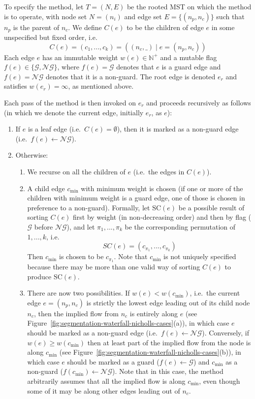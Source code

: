 \documentclass[preprint,a4paper]{elsarticle}
\begin{document}
To specify the method, let $T = (N,E)$ be the rooted MST on which the method is to operate, with node set $N = (n_i)$ and edge set $E = \{(n_p,n_c)\}$ such that $n_p$ is the parent of $n_c$. We define $C(e)$ to be the children of edge $e$ in some unspecified but fixed order, i.e.
%
\[
C(e) = (c_1,...,c_k) = ((n_c,\_) \; | \; e = (n_p,n_c))
\]
%
Each edge $e$ has an immutable weight $w(e) \in \mathbb{N}^+$ and a mutable flag $f(e) \in \{\mathcal{G},\mathcal{NG}\}$, where $f(e) = \mathcal{G}$ denotes that $e$ is a guard edge and $f(e) = \mathcal{NG}$ denotes that it is a non-guard. The root edge is denoted $e_r$ and satisfies $w(e_r) = \infty$, as mentioned above.

Each pass of the method is then invoked on $e_r$ and proceeds recursively as follows (in which we denote the current edge, initially $e_r$, as $e$):
%
\begin{enumerate}

\item If $e$ is a leaf edge (i.e.~$C(e) = \emptyset$), then it is marked as a non-guard edge (i.e.~$f(e) \leftarrow \mathcal{NG}$).

\item Otherwise:

\begin{enumerate}

\item We recurse on all the children of $e$ (i.e.~the edges in $C(e)$).

\item A child edge $c_{\min}$ with minimum weight is chosen (if one or more of the children with minimum weight is a guard edge, one of those is chosen in preference to a non-guard). Formally, let $\mbox{SC}(e)$ be a possible result of sorting $C(e)$ first by weight (in non-decreasing order) and then by flag ($\mathcal{G}$ before $\mathcal{NG}$), and let $\pi_1,...,\pi_k$ be the corresponding permutation of $1,...,k$, i.e.
%
\[
SC(e) = (c_{\pi_1},...,c_{\pi_k})
\]
%
Then $c_{\min}$ is chosen to be $c_{\pi_1}$. Note that $c_{\min}$ is not uniquely specified because there may be more than one valid way of sorting $C(e)$ to produce $\mbox{SC}(e)$.

\item There are now two possibilities. If $w(e) < w(c_{\min})$, i.e.~the current edge $e = (n_p,n_c)$ is strictly the lowest edge leading out of its child node $n_c$, then the implied flow from $n_c$ is entirely along $e$ (see Figure~\ref{fig:segmentation-waterfall-nicholls-cases}(a)), in which case $e$ should be marked as a non-guard edge (i.e.~$f(e) \leftarrow \mathcal{NG}$). Conversely, if $w(e) \ge w(c_{\min})$ then at least part of the implied flow from the node is along $c_{\min}$ (see Figure~\ref{fig:segmentation-waterfall-nicholls-cases}(b)), in which case $e$ should be marked as a guard ($f(e) \leftarrow \mathcal{G}$) and $c_{\min}$ as a non-guard ($f(c_{\min}) \leftarrow \mathcal{NG}$). Note that in this case, the method arbitrarily assumes that all the implied flow is along $c_{\min}$, even though some of it may be along other edges leading out of $n_c$.


\end{enumerate}
\end{enumerate}
\end{document}
